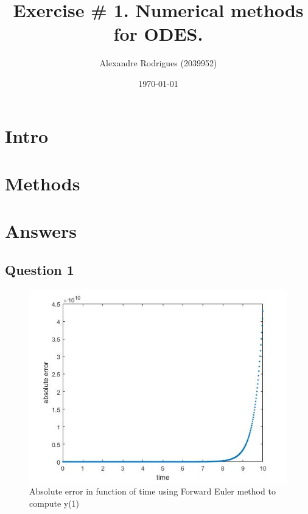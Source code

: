 \documentclass[a4paper, 11pt]{article}
\begin{document}
	
	\title{Exercise \# 1. Numerical methods for ODES. }
	\author{{\small Alexandre Rodrigues (2039952)}}
	\date{\today}
	
	\maketitle
	
	\section*{Intro}
	
	\section*{Methods}
	
	
	\section*{Answers}
	\subsection*{Question 1}
	\begin{figure}[H]
		\centering
		\includegraphics[width=\linewidth]{ex1_fe.jpg}
		\caption{Absolute error in function of time using Forward Euler method to compute y(1)}
		\label{fig:ex1_fe}
	\end{figure}
	
\end{document}
